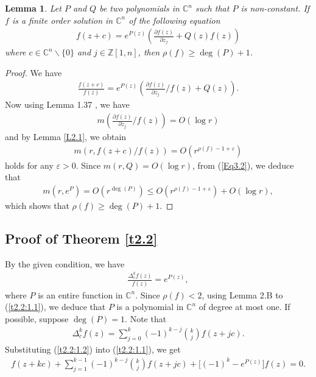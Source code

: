 \documentclass[11pt,reqno]{amsart}
\newtheorem{lem}{Lemma}[section]
\numberwithin{equation}{section}
\begin{document}
\begin{lem}\label{L2.8} Let $P$ and $Q$ be two polynomials in $\mathbb{C}^n$ such that $P$ is non-constant. If $f$ is a finite order solution in $\mathbb{C}^n$ of the following equation
\begin{align*}
f(z+c)=e^{P(z)}\left(\frac{\partial f(z)}{\partial z_j}+Q(z)f(z)\right)
\end{align*}
where $c\in\mathbb{C}^n\backslash \{0\}$ and $j\in\mathbb{Z}[1,n]$, then $\rho(f)\geq \deg(P)+1$.
\end{lem}
\begin{proof} We have
\begin{align}\label{Eq3.2}
\frac{f(z+c)}{f(z)}=e^{P(z)}\left(\frac{\partial f(z)}{\partial z_j}/f(z)+Q(z)\right).
\end{align}
Now using Lemma 1.37 \cite{Hu-Li-Yang-2003}, we have
\begin{align*}
m\left(\frac{\partial f(z)}{\partial z_j}/f(z)\right)=O(\log r)
\end{align*}
and by Lemma \ref{L2.1}, we obtain
\begin{align*}
m\left(r,f(z+c)/f(z)\right)=O\left(r^{\rho(f)-1+\varepsilon}\right)
 \end{align*}
holds for any $\varepsilon>0$. Since $m(r,Q)=O(\log r)$, from (\ref{Eq3.2}), we deduce that
\begin{align*}
m(r,e^P)=O(r^{\deg(P)})\leq O\left(r^{\rho(f)-1+\varepsilon}\right)+O(\log r),
\end{align*}
which shows that $\rho(f)\geq \deg(P)+1$.
\end{proof}

\subsection{{Proof of Theorem \ref{t2.2}}} By the given condition, we have
\begin{align}\label{t2.2:1.1}
\frac{\Delta_c^k f(z)}{f(z)}=e^{P(z)},
\end{align}
where $P$ is an entire function in $\mathbb{C}^n$. Since $\rho(f)<2$, using Lemma 2.B to (\ref{t2.2:1.1}), we deduce that $P$ is a polynomial in $\mathbb{C}^n$ of degree at most one. If possible, suppose $\deg(P)=1$. Note that
\begin{align}\label{t2.2:1.2}
\Delta_c^{k} f(z)=\sum_{j=0}^{k}(-1)^{k-j}\binom{k}{j}f(z + jc).
\end{align}
Substituting (\ref{t2.2:1.2}) into (\ref{t2.2:1.1}), we get
\begin{align}\label{t2.2:1.3}
f(z + kc)+\sum_{j=1}^{k-1}(-1)^{k-j}\binom{k}{j}f(z + jc)+\bigl[(-1)^k - e^{P(z)}\bigr]f(z)= 0.
\end{align}
\end{document}
